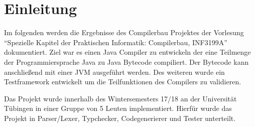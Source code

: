 \chapter{Einleitung}

Im folgenden werden die Ergebnisse des Compilerbau Projektes
der Vorlesung \enquote{Spezielle Kapitel der Praktischen Informatik: Compilerbau, INF3199A}
dokumentiert.
Ziel war es einen Java Compiler zu entwickeln der eine Teilmenge der Programmiersprache
Java \cite{aufgabenstellung} zu Java Bytecode\cite{bytecode} compiliert.
Der Bytecode kann anschließend mit einer \ac{JVM}\cite{jvm} ausgeführt werden.
Des weiteren wurde ein Testframework entwickelt um die Teilfunktionen
des Compilers zu validieren.

Das Projekt wurde innerhalb des Wintersemesters 17/18 an der Universität
Tübingen in einer Gruppe von 5 Leuten implementiert.
Hierfür wurde das Projekt in Parser/Lexer, Typchecker, Codegenerierer und Tester unterteilt.
